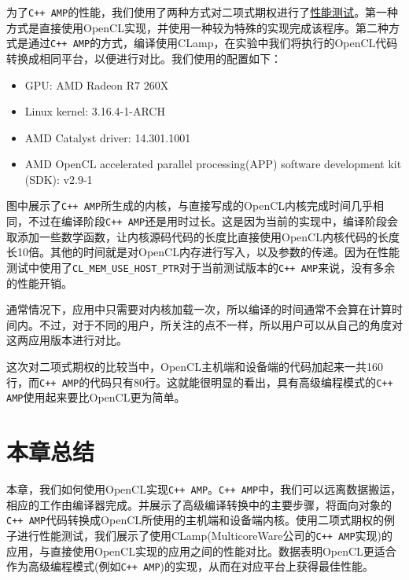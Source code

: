 为了\texttt{C++ AMP}的性能，我们使用了两种方式对二项式期权进行了\href{http://bitbucket.org/UncleHandsome/benchmark}{性能测试}。第一种方式是直接使用OpenCL实现，并使用一种较为特殊的实现完成该程序。第二种方式是通过\texttt{C++ AMP}的方式，编译使用CLamp，在实验中我们将执行的OpenCL代码转换成相同平台，以便进行对比。我们使用的配置如下：

\begin{itemize}
\item GPU: AMD Radeon R7 260X
\item Linux kernel: 3.16.4-1-ARCH
\item AMD Catalyst driver: 14.301.1001
\item AMD OpenCL accelerated parallel processing(APP) software development kit (SDK): v2.9-1
\end{itemize}


图中展示了\texttt{C++ AMP}所生成的内核，与直接写成的OpenCL内核完成时间几乎相同，不过在编译阶段\texttt{C++ AMP}还是用时过长。这是因为当前的实现中，编译阶段会取添加一些数学函数，让内核源码代码的长度比直接使用OpenCL内核代码的长度长10倍。其他的时间就是对OpenCL内存进行写入，以及参数的传递。因为在性能测试中使用了\texttt{CL\_MEM\_USE\_HOST\_PTR}对于当前测试版本的\texttt{C++ AMP}来说，没有多余的性能开销。

通常情况下，应用中只需要对内核加载一次，所以编译的时间通常不会算在计算时间内。不过，对于不同的用户，所关注的点不一样，所以用户可以从自己的角度对这两应用版本进行对比。

这次对二项式期权的比较当中，OpenCL主机端和设备端的代码加起来一共160行，而\texttt{C++ AMP}的代码只有80行。这就能很明显的看出，具有高级编程模式的\texttt{C++ AMP}使用起来要比OpenCL更为简单。



\section{本章总结}

本章，我们如何使用OpenCL实现\texttt{C++ AMP}。\texttt{C++ AMP}中，我们可以远离数据搬运，相应的工作由编译器完成。并展示了高级编译转换中的主要步骤，将面向对象的\texttt{C++ AMP}代码转换成OpenCL所使用的主机端和设备端内核。使用二项式期权的例子进行性能测试，我们展示了使用CLamp(MulticoreWare公司的\texttt{C++ AMP}实现)的应用，与直接使用OpenCL实现的应用之间的性能对比。数据表明OpenCL更适合作为高级编程模式(例如\texttt{C++ AMP})的实现，从而在对应平台上获得最佳性能。


